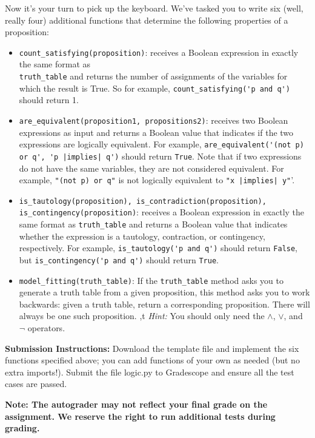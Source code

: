 \documentclass{article}
\begin{document}
    Now it's your turn to pick up the keyboard. We've tasked you to write six (well, really four) additional functions that determine the following properties of a proposition:
    \begin{itemize}
        \item \verb+count_satisfying(proposition)+: receives a Boolean expression in exactly the same format as \\ \verb+truth_table+ and returns the number of assignments of the variables for which the result is True. So for example, \verb+count_satisfying('p and q')+ should return 1.
        \item \verb+are_equivalent(proposition1, propositions2)+: receives two Boolean expressions as input and returns a Boolean value that indicates if the two expressions are logically equivalent. For example, \verb+are_equivalent('(not p) or q', 'p |implies| q')+ should return \verb+True+. Note that if two expressions do not have the same variables, they are not considered equivalent. For example, \verb+"(not p) or q"+ is not logically equivalent to \verb+"x |implies| y"+'.
        \item \verb+is_tautology(proposition), is_contradiction(proposition), is_contingency(proposition)+: receives a Boolean expression in exactly the same format as \verb+truth_table+ and returns a Boolean value that indicates whether the expression is a tautology, contraction, or contingency, respectively. For example, \verb+is_tautology('p and q')+ should return \verb+False+, but \verb+is_contingency('p and q')+ should return \verb+True+.
        \item \verb+model_fitting(truth_table)+: If the \verb+truth_table+ method asks you to generate a truth table from a given proposition, this method asks you to work backwards: given a truth table, return a corresponding proposition. There will always be one such proposition.
,t
        \textit{Hint:} You should only need the $\land$, $\lor$, and $\neg$ operators.
    \end{itemize}

    \vspace{3mm}
    \textbf{Submission Instructions:} 
    Download the template file and implement the six functions specified above; you can add functions of your own as needed (but no extra imports!). Submit the file logic.py to Gradescope and ensure all the test cases are passed. 

    \vspace{3mm}
    \textbf{Note: The autograder may not reflect your final grade on the assignment. We reserve the right to run additional tests during grading.}
    
\end{document}
